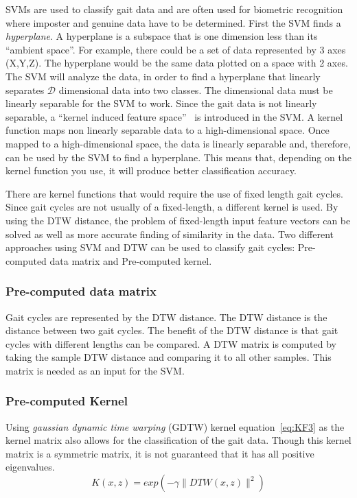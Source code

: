 \documentclass{sig-alternate}
\begin{document}
	SVMs are used to classify gait data and are often used for biometric recognition where imposter and genuine data have to be determined. First the SVM finds a \textit{hyperplane}. A hyperplane is a subspace that is one dimension less than its ``ambient space''. For example, there could be a set of data represented by 3 axes (X,Y,Z). The hyperplane would be the same data plotted on a space with 2 axes. The SVM will analyze the data, in order to find a hyperplane that linearly separates \begin{math}\mathcal{D} \end{math} dimensional data into two classes. The dimensional data must be linearly separable for the SVM to work. Since the gait data is not linearly separable, a ``kernel induced feature space''~\cite{Muaaz:2013} is introduced in the SVM. A kernel function maps non linearly separable data to a high-dimensional space. Once mapped to a high-dimensional space, the data is linearly separable and, therefore, can be used by the SVM to find a hyperplane. This means that, depending on the kernel function you use, it will produce better classification accuracy. 

There are kernel functions that would require the use of fixed length gait cycles. Since gait cycles are not usually of a fixed-length, a different kernel is used. By using the DTW distance, the problem of fixed-length input feature vectors can be solved as well as more accurate finding of similarity in the data. Two different approaches using SVM and DTW can be used to classify gait cycles: Pre-computed data matrix and Pre-computed kernel.

\subsubsection{Pre-computed data matrix}
	Gait cycles are represented by the DTW distance. The DTW distance is the distance between two gait cycles. The benefit of the DTW distance is that gait cycles with different lengths can be compared. A DTW matrix is computed by taking the sample DTW distance and comparing it to all other samples. This matrix is needed as an input for the SVM.	

\subsubsection{Pre-computed Kernel}
Using \textit{gaussian dynamic time warping} (GDTW) kernel equation~\eqref{eq:KF3} as the kernel matrix also allows for the classification of the gait data. Though this kernel matrix is a symmetric matrix, it is not guaranteed that it has all positive eigenvalues. 
\begin{equation} \label{eq:KF3}
K(x,z)=exp(-\gamma \parallel DTW(x,z) \parallel ^2)
\end{equation}	
\end{document}
